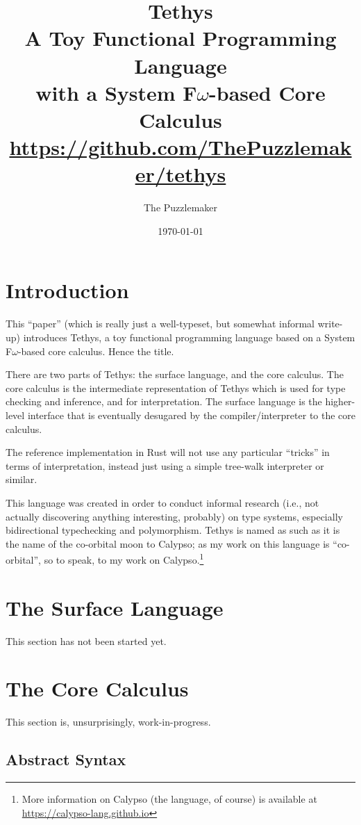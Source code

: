 \documentclass[11pt]{article}
\title{Tethys\\
    \large A Toy Functional Programming Language\\
    with a System F$\omega$-based Core Calculus\\
    \url{https://github.com/ThePuzzlemaker/tethys}}
\author{The Puzzlemaker}
\date{\today}
\begin{document}
\maketitle

\tableofcontents
\newpage

\section{Introduction}

This ``paper'' (which is really just a well-typeset, but somewhat informal write-up) introduces Tethys, a toy functional programming language based on a System F$\omega$-based core calculus. Hence the title.

There are two parts of Tethys: the surface language, and the core calculus. The core calculus is the intermediate representation of Tethys which is used for type checking and inference, and for interpretation. The surface language is the higher-level interface that is eventually desugared by the compiler/interpreter to the core calculus.

The reference implementation in Rust will not use any particular ``tricks'' in terms of interpretation, instead just using a simple tree-walk interpreter or similar.

This language was created in order to conduct informal research (i.e., not actually discovering anything interesting, probably) on type systems, especially bidirectional typechecking and polymorphism. Tethys is named as such as it is the name of the co-orbital moon to Calypso; as my work on this language is ``co-orbital'', so to speak, to my work on Calypso.\footnote{More information on Calypso (the language, of course) is available at \url{https://calypso-lang.github.io}}

\section{The Surface Language}

This section has not been started yet.

\section{The Core Calculus}

This section is, unsurprisingly, work-in-progress.

\subsection{Abstract Syntax}
\end{document}
